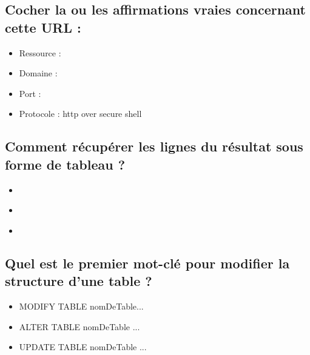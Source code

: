 \documentclass[11pt,a4paper]{article}
\begin{document}
\subsection{Cocher la ou les affirmations vraies concernant cette URL :}


\bigskip

\begin{itemize}
\item[\CaseCoche] Ressource :  \\
\item[\CaseCoche] Domaine :  \\
\item[\CaseCoche] Port :  \\
\item[\CaseCoche] Protocole : http over secure shell \\
\end{itemize}


\subsection{Comment récupérer les lignes du résultat sous forme de tableau ?}


\bigskip

\begin{itemize}
\item[\CaseCoche]  \\
\item[\CaseCoche]  \\
\item[\CaseCoche]  \\
\end{itemize}


\subsection{Quel est le premier mot-clé pour modifier la structure d'une table ?}

\begin{itemize}
\item[\CaseCoche] MODIFY TABLE nomDeTable... \\
\item[\CaseCoche] ALTER TABLE nomDeTable ... \\
\item[\CaseCoche] UPDATE TABLE nomDeTable ... \\
\end{itemize}
\end{document}
